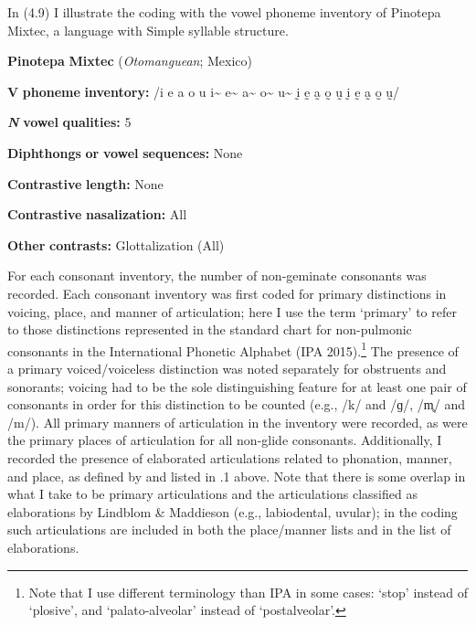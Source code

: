   In (4.9) I illustrate the coding with the vowel phoneme inventory of Pinotepa Mixtec, a language with Simple syllable structure.



\ea\label{ex:(4.9)}
   \textbf{Pinotepa} \textbf{Mixtec} (\textit{Otomanguean}; Mexico)



\textbf{V} \textbf{phoneme} \textbf{inventory:} /i e a o u i\~{}  e\~{}  a\~{}  o\~{}  u\~{}  ḭ ḛ a̰ o̰ ṵ ḭ ḛ a̰ o̰ ṵ/



\textbf{\textit{N}} \textbf{vowel} \textbf{qualities:} 5



\textbf{Diphthongs} \textbf{or} \textbf{vowel} \textbf{sequences:} None



\textbf{Contrastive} \textbf{length:} None



\textbf{Contrastive} \textbf{nasalization:} All



\textbf{Other} \textbf{contrasts:} Glottalization (All)
\z



  For each consonant inventory, the number of non-geminate consonants was recorded. Each consonant inventory was first coded for primary distinctions in voicing, place, and manner of articulation; here I use the term ‘primary’ to refer to those distinctions represented in the standard chart for non-pulmonic consonants in the International Phonetic Alphabet (IPA 2015).\footnote{ \textrm{Note that I use different terminology than IPA in some cases: ‘stop’ instead of ‘plosive’, and ‘palato-alveolar’ instead of ‘postalveolar’.}} The presence of a primary voiced/voiceless distinction was noted separately for obstruents and sonorants; voicing had to be the sole distinguishing feature for at least one pair of consonants in order for this distinction to be counted (e.g., /k/ and /ɡ/, /m̥/ and /m/). All primary manners of articulation in the inventory were recorded, as were the primary places of articulation for all non-glide consonants. Additionally, I recorded the presence of elaborated articulations related to phonation, manner, and place, as defined by \citet{LindblomMaddieson1988} and listed in .1 above. Note that there is some overlap in what I take to be primary articulations and the articulations classified as elaborations by Lindblom \& Maddieson (e.g., labiodental, uvular); in the coding such articulations are included in both the place/manner lists and in the list of elaborations.



